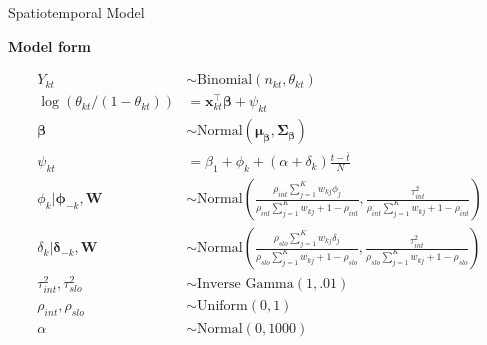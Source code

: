 \documentclass[final]{beamer}
\newlength{\colwidmiddle}
\begin{document}
\begin{frame}[t]
\begin{columns}[t]
\begin{column}{\colwidmiddle}
 \begin{alertblock}{Spatiotemporal Model}
    
\textbf{Model form}

\begin{align*}
  Y_{kt} &\sim \text{Binomial}( n_{kt}, \theta_{kt} ) \\
    \log \left( \theta_{kt}/(1 - \theta_{kt}) \right) &= \mathbf{x}_{kt}^\top\mathbf{\beta} + \psi_{kt} \\
  \mathbf{\beta} &\sim \text{Normal}(\mathbf{\mu}_{\mathbf{\beta}},
                   \mathbf{\Sigma}_{\mathbf{\beta}})\\
  \psi_{kt} &= \beta_1 + \phi_k + (\alpha +
              \delta_k)\frac{t-\bar{t}}{N} \\
  \phi_k | \pmb{\phi}_{-k}, \mathbf{W} &\sim \text{Normal}\left(
          \frac{\rho_{int} \sum_{j=1}^K  w_{kj}
                                        \phi_j}{\rho_{int}\sum_{j=1}^K
                                        w_{kj} + 1 - \rho_{int}},
          \frac{\tau^2_{int}}{\rho_{int}\sum_{j=1}^K
                                        w_{kj} + 1 -
                                        \rho_{int}}\right)\\
  \delta_k | \pmb{\delta}_{-k}, \mathbf{W} &\sim \text{Normal}\left(
          \frac{\rho_{slo} \sum_{j=1}^K  w_{kj}
                                        \delta_j}{\rho_{slo}\sum_{j=1}^K
                                        w_{kj} + 1 - \rho_{slo}},
          \frac{\tau^2_{int}}{\rho_{slo}\sum_{j=1}^K
                                        w_{kj} + 1 -
                                                \rho_{slo}}\right)\\
  \tau_{int}^2, \tau_{slo}^2 &\sim \text{Inverse Gamma}(1,.01)\\
  \rho_{int}, \rho_{slo} &\sim \text{Uniform}(0,1)\\
  \alpha &\sim \text{Normal}(0, 1000)\\
\end{align*}


\end{alertblock}
\end{column}
\end{columns}
\end{frame}
\end{document}
